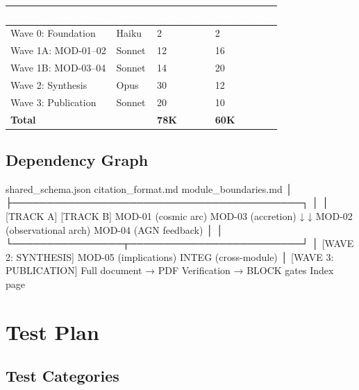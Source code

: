 \documentclass[11pt,letterpaper]{article}
\newcommand{\tableheader}[1]{\textbf{\sffamily\textcolor{white}{#1}}}
\begin{document}
\begin{center}
\begin{tabularx}{\textwidth}{L{4cm}C{2.5cm}C{2.5cm}C{2.5cm}}
\toprule
{}
\tableheader{Wave / Component} & \tableheader{Model} & \tableheader{Input (K)} & \tableheader{Output (K)} \\
\midrule
Wave 0: Foundation & Haiku & 2 & 2 \\
Wave 1A: MOD-01--02 & Sonnet & 12 & 16 \\
Wave 1B: MOD-03--04 & Sonnet & 14 & 20 \\
Wave 2: Synthesis & Opus & 30 & 12 \\
Wave 3: Publication & Sonnet & 20 & 10 \\
\midrule
\textbf{Total} & & \textbf{78K} & \textbf{60K} \\
\bottomrule
\end{tabularx}
\end{center}

\subsection{Dependency Graph}

\begin{asciibox}
  shared_schema.json
  citation_format.md
  module_boundaries.md
         │
         ├──────────────────────────────────────────┐
         │                                          │
  [TRACK A]                                 [TRACK B]
  MOD-01 (cosmic arc)                       MOD-03 (accretion)
         ↓                                         ↓
  MOD-02 (observational arch)               MOD-04 (AGN feedback)
         │                                         │
         └────────────────┬─────────────────────────┘
                          │
                  [WAVE 2: SYNTHESIS]
                  MOD-05 (implications)
                  INTEG (cross-module)
                          │
                  [WAVE 3: PUBLICATION]
                  Full document → PDF
                  Verification → BLOCK gates
                  Index page
\end{asciibox}

\section{Test Plan}

\subsection{Test Categories}
\end{document}
